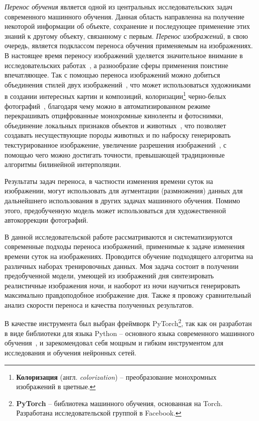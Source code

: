 \documentclass[11pt,a4paper]{extarticle}
\begin{document}
	\textit{Перенос обучения} является одной из центральных исследовательских задач современного машинного обучения.
	Данная область направленна на получение некоторой информации об объекте, сохранение и последующее применение этих знаний к другому объекту, связанному с первым.   
	\textit{Перенос изображений}, в свою очередь, является подклассом переноса обучения применяемым на изображениях. 
	В настоящее время переносу изображений уделяется значительное внимание в исследовательских работах~\cite{i2ipapers}, а разнообразие сферы применения поистине впечатляющее.
	Так с помощью переноса изображений можно добиться объединения стилей двух изображений~\cite{style_transfer}, что может использоваться художниками в создании интересных картин и композиций,
	колоризации\footnote{ \textbf{Колоризация} (англ. \textit{colorization}) -- преобразование монохромных изображений в цветные.} черно-белых фотографий~\cite{color_transfer},
	благодаря чему можно в автоматизированном режиме перекрашивать отцифрованные монохромные киноленты и фотоснимки,
	объединение локальных признаков объектов и животных~\cite{CycleGAN}, что позволяет создавать несуществующие породы животных и по наброску генерировать текстурированное изображение,
	увеличение разрешения изображений~\cite{super_resolution}, с помощью чего можно достигать точности, превышающей традиционные алгоритмы билинейной интерполяции.

	Результаты задач переноса, в частности изменения времени суток на изображении, могут использовать для аугментации (размножения) данных для дальнейшнего использования в других задачах машинного обучения.
	Помимо этого, предобученную модель может использоваться для художественной автокоррекции фотографий.
	
	В данной исследовательской работе рассматриваются и систематизируются современные подходы переноса изображений, применимые к задаче изменения времени суток на изображениях.
	Проводится обучение подходящего алгоритма на различных наборах тренировочных данных.
	Моя задача состоит в получении предобученной модели, умеющей из изображений дня синтезировать реалистичные изображения ночи,
	и наоборот из ночи научиться генерировать максимально правдоподобное изображение дня. 
	Также я провожу сравнительный анализ скорости переноса и качества полученных результатов.

	В качестве инструмента был выбран фреймворк PyTorch\footnote{
		\textbf{PyTorch} -- библиотека машинного обучения, основанная на Torch. Разработана исследовательской группой в Facebook.
	}, так как он разработан в виде библиотеки для языка Python -- основного языка современного машинного обучения~\cite{ml_lang},
	и зарекомендовал себя мощным и гибким инструментом для исследования и обучения нейронных сетей.
\end{document}
